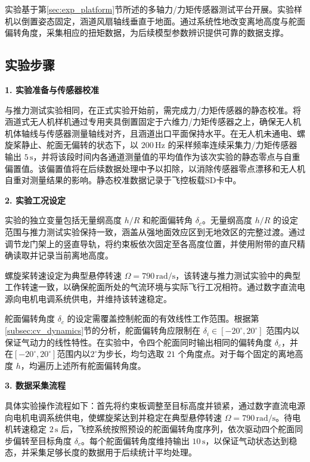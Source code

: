 实验基于第\ref{sec:exp_platform}节所述的多轴力/力矩传感器测试平台开展。实验样机以倒置姿态固定，涵道风扇轴线垂直于地面。通过系统性地改变离地高度与舵面偏转角度，采集相应的扭矩数据，为后续模型参数辨识提供可靠的数据支撑。

\subsection{实验步骤}
\label{subsec:torque_exp}

\textbf{1. 实验准备与传感器校准}

与推力测试实验相同，在正式实验开始前，需完成力/力矩传感器的静态校准。将涵道式无人机样机通过专用夹具倒置固定于六维力/力矩传感器之上，确保无人机机体轴线与传感器测量轴线对齐，且涵道出口平面保持水平。在无人机未通电、螺旋桨静止、舵面无偏转的状态下，以 $200\,\mathrm{Hz}$ 的采样频率连续采集力/力矩传感器输出 $5\,\mathrm{s}$，并将该段时间内各通道测量值的平均值作为该次实验的静态零点与自重偏置值。该偏置值将在后续数据处理中予以扣除，以消除传感器零点漂移和无人机自重对测量结果的影响。静态校准数据记录于飞控板载SD卡中。

\textbf{2. 实验工况设定}

实验的独立变量包括无量纲高度 $h/R$ 和舵面偏转角 $\delta_c$。无量纲高度 $h/R$ 的设定范围与推力测试实验保持一致，涵盖从强地面效应区到无地效区的完整过渡。通过调节龙门架上的竖直导轨，将约束板依次固定至各高度位置，并使用附带的直尺精确读取并记录当前离地高度。

螺旋桨转速设定为典型悬停转速 $\Omega = 790\,\mathrm{rad/s}$，该转速与推力测试实验中的典型工作转速一致，以确保舵面所处的气流环境与实际飞行工况相符。通过数字直流电源向电机电调系统供电，并维持该转速稳定。

舵面偏转角度 $\delta_c$ 的设定需覆盖控制舵面的有效线性工作范围。根据第\ref{subsec:cv_dynamics}节的分析，舵面偏转角应限制在 $\delta_i \in [-20^\circ, 20^\circ]$ 范围内以保证气动力的线性特性。在实验中，令四个舵面同时输出相同的偏转角度 $\delta_c$，并在$[-20^\circ, 20^\circ]$范围内以$2^\circ$为步长，均匀选取 $21$ 个角度点。对于每个固定的离地高度 $h$，均遍历上述所有舵面偏转角度。

\textbf{3. 数据采集流程}

具体实验操作流程如下：首先将约束板调整至目标高度并锁紧，通过数字直流电源向电机电调系统供电，使螺旋桨达到并稳定在典型悬停转速 $\Omega = 790\,\mathrm{rad/s}$。待电机转速稳定 $2\,\mathrm{s}$ 后，飞控系统按照预设的舵面偏转角度序列，依次驱动四个舵面同步偏转至目标角度 $\delta_c$。每个舵面偏转角度维持输出 $10\,\mathrm{s}$，以保证气动状态达到稳态，并采集足够长度的数据用于后续统计平均处理。

